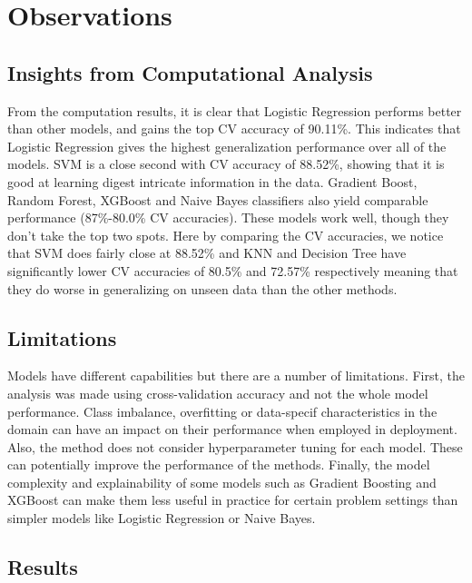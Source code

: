 \chapter{Observations}
\section{Insights from Computational Analysis} 

From the computation results, it is clear that Logistic Regression performs better than other models, and gains the top CV accuracy of 90.11\%. This indicates that Logistic Regression gives the highest generalization performance over all of the models. SVM is a close second with CV accuracy of 88.52\%, showing that it is good at learning digest intricate information in the data. Gradient Boost, Random Forest, XGBoost and Naive Bayes  classifiers also yield comparable performance (87\%-80.0\% CV accuracies). These models work well, though they don’t take the top two spots. Here by comparing the CV accuracies, we notice that SVM does fairly close at 88.52\% and KNN and Decision Tree have significantly lower CV accuracies of 80.5\% and 72.57\% respectively meaning that they do worse in generalizing on unseen data than the other methods.




\section{Limitations} 

Models have different capabilities but there are a number of limitations. First, the analysis was made using cross-validation accuracy and not the whole model performance. Class imbalance, overfitting or data-specif characteristics in the domain can have an impact on their performance when employed in deployment. Also, the method does not consider hyperparameter tuning for each model. These can potentially improve the performance of the methods. Finally, the model complexity and explainability of some models such as Gradient Boosting and XGBoost can make them less useful in practice for certain problem settings than simpler models like Logistic Regression or Naive Bayes.


\section{Results}



